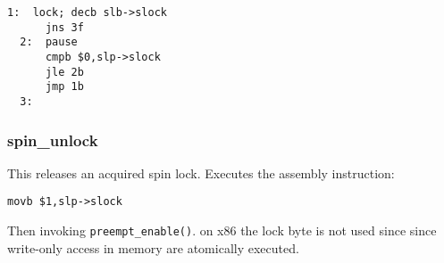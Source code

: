 \documentclass{article}
\begin{document}
\begin{lstlisting}[language=anX86]
  1:  lock; decb slb->slock
      jns 3f
  2:  pause
      cmpb $0,slp->slock
      jle 2b
      jmp 1b
  3: 
\end{lstlisting}

\subsubsection{spin\_unlock}

This releases an acquired spin lock. Executes the assembly instruction:


\begin{lstlisting}[language=anX86]
  movb $1,slp->slock
\end{lstlisting}

Then invoking \lstinline{preempt_enable()}. on x86 the lock byte is
not used since since write-only access in memory are atomically
executed.






\end{document}
